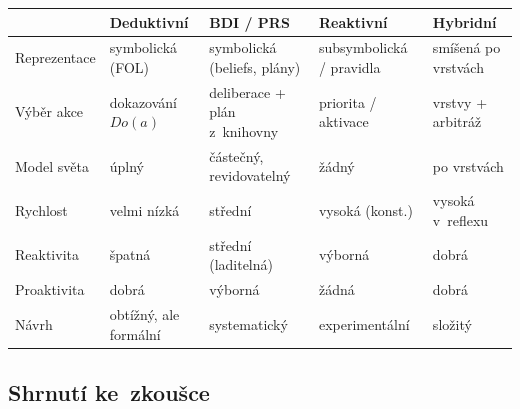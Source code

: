\documentclass[11pt,a4paper]{article}
\theoremstyle{definition}
\begin{document}
\begin{center}
\small
\begin{tabular}{@{}p{}
  >{\raggedright\arraybackslash}p{}
  >{\raggedright\arraybackslash}p{}
  >{\raggedright\arraybackslash}p{}
  >{\raggedright\arraybackslash}p{}@{}}
\toprule
& \textbf{Deduktivní} & \textbf{BDI / PRS} & \textbf{Reaktivní} & \textbf{Hybridní} \\
\midrule
Reprezentace & symbolická (FOL) & symbolická (beliefs, plány) & subsymbolická / pravidla
  & smíšená po vrstvách \\
Výběr akce & dokazování $\mathit{Do}(a)$ & deliberace + plán z~knihovny
  & priorita / aktivace & vrstvy + arbitráž \\
Model světa & úplný & částečný, revidovatelný & žádný & po vrstvách \\
Rychlost & velmi nízká & střední & vysoká (konst.) & vysoká v~reflexu \\
Reaktivita & špatná & střední (laditelná) & výborná & dobrá \\
Proaktivita & dobrá & výborná & žádná & dobrá \\
Návrh & obtížný, ale formální & systematický & experimentální & složitý \\
\bottomrule
\end{tabular}
\end{center}

\subsection{Shrnutí ke~zkoušce}
\end{document}
